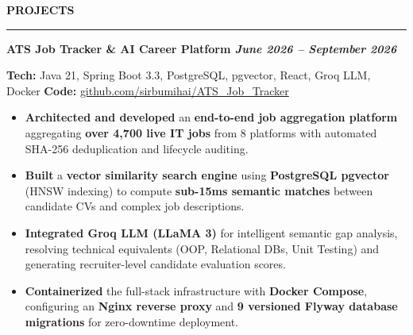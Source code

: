 \documentclass[10pt,letterpaper]{article}
\newenvironment{rSection}[1]{
  \vspace{4pt}
  {\bfseries\MakeUppercase{#1}}
  \vspace{2pt}
  \hrule
  \vspace{3pt}
}{
  \par\vspace{2pt}
}
\renewcommand{\section}[1]{\par\vspace{3pt}\noindent\textbf{#1}\par\vspace{1pt}}
\begin{document}
\vspace{-0.2cm}
\begin{rSection}{Projects}

\section{ATS Job Tracker \& AI Career Platform \hfill \normalfont\textit{June 2026 – September 2026}}
\textbf{Tech:} Java 21, Spring Boot 3.3, PostgreSQL, pgvector, React, Groq LLM, Docker \hfill
\textbf{Code:} \href{https://github.com/sirbumihai/ATS_Job_Tracker}{github.com/sirbumihai/ATS\_Job\_Tracker}
\begin{itemize}
    \item \textbf{Architected and developed} an \textbf{end-to-end job aggregation platform} aggregating \textbf{over 4,700 live IT jobs} from 8 platforms with automated SHA-256 deduplication and lifecycle auditing.
    \item \textbf{Built} a \textbf{vector similarity search engine} using \textbf{PostgreSQL pgvector} (HNSW indexing) to compute \textbf{sub-15ms semantic matches} between candidate CVs and complex job descriptions.
    \item \textbf{Integrated Groq LLM (LLaMA 3)} for intelligent semantic gap analysis, resolving technical equivalents (OOP, Relational DBs, Unit Testing) and generating recruiter-level candidate evaluation scores.
    \item \textbf{Containerized} the full-stack infrastructure with \textbf{Docker Compose}, configuring an \textbf{Nginx reverse proxy} and \textbf{9 versioned Flyway database migrations} for zero-downtime deployment.
\end{itemize}


\end{rSection}
\end{document}
